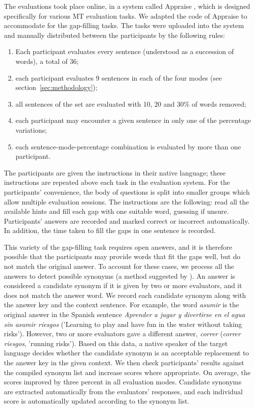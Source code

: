 \documentclass[11pt]{article}
\begin{document}
The evaluations took place online, in a system called Appraise \citep{federmann12}, which is 
designed specifically for various MT evaluation tasks. We adapted the code of Appraise to 
accommodate for the gap-filling tasks. The tasks were uploaded into the system and 
manually distributed between the participants by the following rules:
\begin{enumerate}
\item  Each participant evaluates every sentence (understood as a succession of words),
a total of 36;
\item  each participant evaluates 9 sentences in each of the four modes (see section~\ref{sec:methodology});
\item  all sentences of the set are evaluated with 10, 20 and 30\% of words removed;
\item each participant may encounter a given sentence in only one of the percentage variations;
\item  each sentence-mode-percentage combination is evaluated by more than one participant.
\end{enumerate}


The participants are given the instructions in their native language; these instructions are repeated above each task in the evaluation system. For the participants' convenience, the body of questions is split into smaller groups which allow multiple evaluation sessions. The instructions are the 
following: read all the available hints and fill each gap with one suitable word, guessing if unsure.
Participants' answers are recorded and marked correct or incorrect automatically. In
addition, the time taken to fill the gaps in one sentence is recorded.

This variety of the gap-filling task requires open answers, and it is therefore possible that the participants may
provide words that fit the gaps well, but do not match the original answer. To account for
these cases, we process all the answers to detect possible synonyms (a method suggested by \cite{oregan13}). An answer is
considered a candidate synonym if it is given by two or more evaluators, and it does not match
the answer word. We record each candidate synonym along with the answer key and the
context sentence. For example, the word \emph{asumir} is the original answer in the Spanish sentence \emph{Aprender a jugar y divertirse en el agua sin asumir riesgos} ('Learning to play and have fun in the water without taking risks'). However, two or more evaluators gave a different answer, \emph{correr} (\emph{correr riesgos}, 'running risks'). Based on this data, a native speaker of the target language decides
whether the candidate synonym is an acceptable replacement to the answer key in the given
context. We then check participants' results against the compiled synonym list and
increase scores where appropriate. On average, the scores improved by three percent in all evaluation modes. Candidate synonyms are extracted automatically from the evaluators' responses,  and each individual score is automatically updated according to the synonym list.
\end{document}
